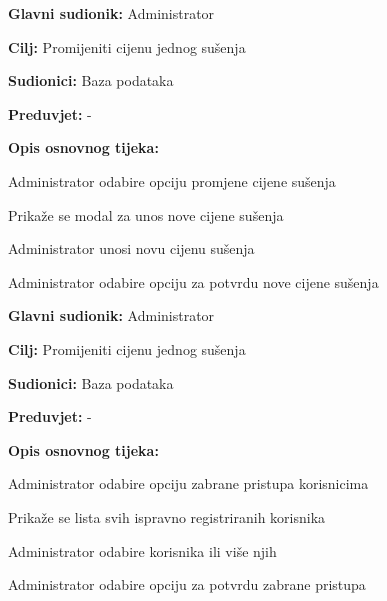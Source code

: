 \noindent {}
\begin{packed_item}
	
	\item \textbf{Glavni sudionik: } Administrator
	\item  \textbf{Cilj:} Promijeniti cijenu jednog sušenja
	\item  \textbf{Sudionici:} Baza podataka
	\item  \textbf{Preduvjet:} -
	\item  \textbf{Opis osnovnog tijeka:}
	
	\item[] \begin{packed_enum}
		
		\item Administrator odabire opciju promjene cijene sušenja
		\item Prikaže se modal za unos nove cijene sušenja
		\item Administrator unosi novu cijenu sušenja
		\item Administrator odabire opciju za potvrdu nove cijene sušenja
	\end{packed_enum}
\end{packed_item}

\noindent {}
\begin{packed_item}
	
	\item \textbf{Glavni sudionik: } Administrator
	\item  \textbf{Cilj:} Promijeniti cijenu jednog sušenja
	\item  \textbf{Sudionici:} Baza podataka
	\item  \textbf{Preduvjet:} -
	\item  \textbf{Opis osnovnog tijeka:}
	
	\item[] \begin{packed_enum}
		
		\item Administrator odabire opciju zabrane pristupa korisnicima
		\item Prikaže se lista svih ispravno registriranih korisnika
		\item Administrator odabire korisnika ili više njih
		\item Administrator odabire opciju za potvrdu zabrane pristupa
	\end{packed_enum}
\end{packed_item}

